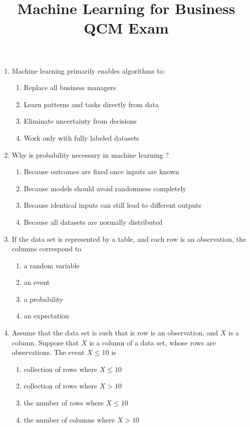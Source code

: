 \documentclass[10pt, oneside]{article}
\title{Machine Learning for Business \\ QCM Exam}
\begin{document}
\maketitle

\begin{enumerate}
    \item Machine learning primarily enables algorithms to:
    \begin{enumerate}
    \item Replace all business managers
    \item Learn patterns and tasks directly from data
    \item Eliminate uncertainty from decisions
    \item Work only with fully labeled datasets
    \end{enumerate}
    
    \item Why is probability necessary in machine learning ?
    \begin{enumerate}
    \item Because outcomes are fixed once inputs are known
    \item Because models should avoid randomness completely
    \item Because identical inputs can still lead to different outputs
    \item Because all datasets are normally distributed
    \end{enumerate}
    
    \item If the data set is represented by a table, and each row 
    is an observation, the columns correspond to
    \begin{enumerate}
    \item a random variable
    \item an event
    \item a probability
    \item an expectation
    \end{enumerate}
    
    \item 
    Assume that the data set is such that is row is an observation, and $X$ is a column. 
    Suppose that $X$ is a column of a data set, whose rows are observations. The event $X \le 10$ is 
    \begin{enumerate}
    \item collection of rows where $X \le 10$
    \item collection of rows where $X > 10$
    \item the number of rows where $X \le 10$
    \item the number of columns where $X > 10$
    \end{enumerate}
    

\end{enumerate}
\end{document}

